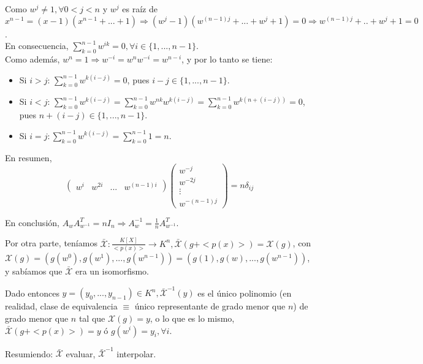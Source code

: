 \documentclass[11pt,a4paper]{article}
\theoremstyle{break}
\begin{document}
Como $w^{j} \neq 1, \forall 0 < j < n$ y $w^{j}$ es raíz de $x^{n-1} = (x-1)(x^{n-1} + ... + 1) \Rightarrow (w^{j} - 1)(w^{(n-1)j} + ... + w^{j} + 1) = 0 \Rightarrow w^{(n-1)j} + .. + w^{j} + 1 = 0$. \\
En consecuencia, $\sum_{k = 0}^{n-1} w^{ik} = 0, \forall i \in \{1, ..., n-1\}$. \\
Como además, $w^{n} = 1 \Rightarrow w^{-i} = w^{n}w^{-i} = w^{n-i}$, y por lo tanto se tiene:
\begin{itemize}
\item Si $i > j$: $\sum_{k = 0}^{n-1} w^{k(i-j)} = 0$, pues $i-j \in \{1, ..., n-1\}$.
\item Si $i < j$: $\sum_{k = 0}^{n-1} w^{k(i-j)} = \sum_{k = 0}^{n-1} w^{nk} w^{k(i-j)} = \sum_{k = 0}^{n-1} w^{k(n +(i-j))} = 0$, pues $n + (i-j) \in \{1, ..., n-1\}$.
\item Si $i = j: \sum_{k = 0}^{n-1} w^{k(i-j)} = \sum_{k=0}^{n-1} 1 = n$.
\end{itemize}

En resumen,
\begin{equation*}
\begin{pmatrix}
w^{i} & w^{2i} & ... & w^{(n-1)i}
\end{pmatrix}
\begin{pmatrix}
w^{-j} \\
w^{-2j} \\
\vdots \\
w^{-(n-1)j}
\end{pmatrix}
= n \delta_{ij}
\end{equation*}

En conclusión, $A_{w} A_{w^{-1}}^{T} = n I_{n} \Rightarrow A_{w}^{-1} = \frac{1}{n} A_{w^{-1}}^{T}$.

Por otra parte, teníamos $\bar{\mathcal{X}}: \frac{K[X]}{<p(x)>} \to K^{n},  \bar{\mathcal{X}}(g + <p(x)>) = \mathcal{X}(g)$, con $\mathcal{X}(g) = (g(w^{0}), g(w^{1}), ..., g(w^{n-1})) = (g(1), g(w), ..., g(w^{n-1}))$, y sabíamos que  $\bar{\mathcal{X}}$ era un isomorfismo.

Dado entonces $y = (y_{0}, ..., y_{n-1}) \in K^{n}, \bar{\mathcal{X}}^{-1}(y)$ es el único polinomio (en realidad, clase de equivalencia $\equiv$ único representante de grado menor que $n$) de grado menor que $n$ tal que  $\mathcal{X}(g) = y$, o lo que es lo mismo,  $\bar{\mathcal{X}}(g + <p(x)>) = y$ ó $g(w^{i}) = y_{i}, \forall i$.

Resumiendo:  $\bar{\mathcal{X}}$ evaluar,  $\bar{\mathcal{X}}^{-1}$ interpolar.
\end{document}
